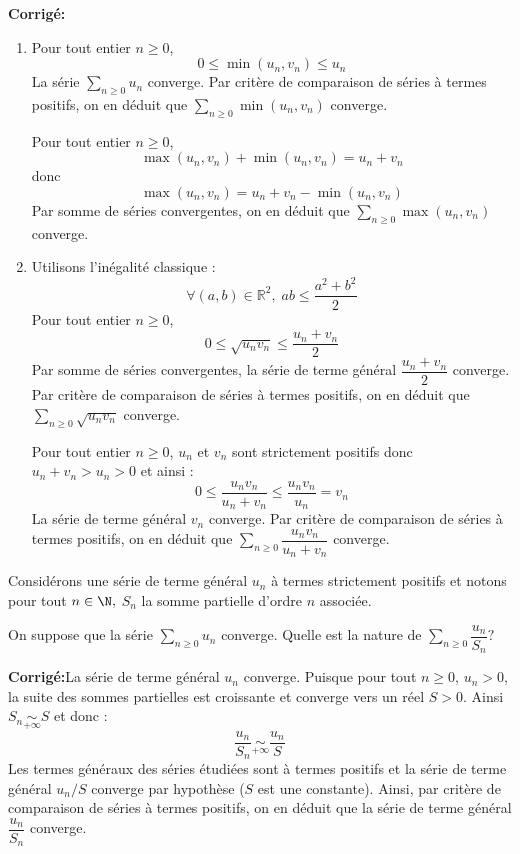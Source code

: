 \documentclass[a4paper,twoside,french,10pt]{VcCours}
\newcommand{\corr}{\textbf{Corrigé:}}
\newcommand{\Sum}[2]{\ensuremath{\textstyle{\sum\limits_{#1}^{#2}}}}
\begin{document}
\corr  

\begin{enumerate}
\item Pour tout entier $n \geq 0$,
$$ 0 \leq  \min(u_n,v_n) \leq u_n $$
La série $\Sum{n \geq 0}{} u_n$ converge. Par critère de comparaison de séries à termes positifs, on en déduit que $\Sum{n \geq 0}{} \min(u_n,v_n)$ converge. 

\medskip

\noindent Pour tout entier $n \geq 0$,
$$  \max(u_n,v_n) + \min(u_n,v_n) = u_n + v_n $$
donc 
$$ \max(u_n,v_n) =   u_n + v_n - \min(u_n,v_n)$$
Par somme de séries convergentes, on en déduit que $\Sum{n \geq 0}{} \max(u_n,v_n)$ converge.
\item Utilisons l'inégalité classique :
$$ \forall (a,b) \in \mathbb{R}^2, \; ab \leq \dfrac{a^2+b^2}{2}$$
Pour tout entier $n \geq 0$,
$$ 0 \leq \sqrt{u_n v_n} \leq \dfrac{u_n+ v_n}{2}$$
Par somme de séries convergentes, la série de terme général $\dfrac{u_n+ v_n}{2}$ converge. Par critère de comparaison de séries à termes positifs, on en déduit que $\Sum{n \geq 0}{} \sqrt{u_n v_n}$ converge. 

\medskip

\noindent Pour tout entier $n \geq 0$, $u_n$ et $v_n$ sont strictement positifs donc $u_n+v_n > u_n >0$ et ainsi :
$$ 0 \leq \dfrac{u_n v_n}{u_n+v_n} \leq \dfrac{u_n v_n}{u_n} = v_n$$
La série de terme général $v_n$ converge. Par critère de comparaison de séries à termes positifs, on en déduit que $\Sum{n \geq 0}{} \dfrac{u_n v_n}{u_n+v_n}$ converge. 
\end{enumerate}

\medskip

\begin{Exercice}{} Considérons une série de terme général $u_n$ à termes strictement positifs et notons pour tout $n\in\N,$ $S_n$ la somme partielle d'ordre $n$ associée. 

On suppose que la série $\Sum{n \geq 0}{} u_n$ converge. Quelle est la nature de $\Sum{n \geq 0}{} \dfrac{u_n}{S_n}?$
\end{Exercice}

\corr La série de terme général $u_n$ converge. Puisque pour tout $n \geq 0$, $u_n>0$, la suite des sommes partielles est croissante et converge vers un réel $S>0.$ Ainsi $S_n \underset{+ \infty}{\sim} S$ et donc :
$$\frac{u_n}{S_n}\underset{+ \infty}{\sim} \frac{u_n}{S}$$
Les termes généraux des séries étudiées sont à termes positifs et la série de terme général $u_n/S$ converge par hypothèse ($S$ est une constante). Ainsi, par critère de comparaison de séries à termes positifs, on en déduit que la série de terme général $\dfrac{u_n}{S_n}$ converge.
\end{document}
